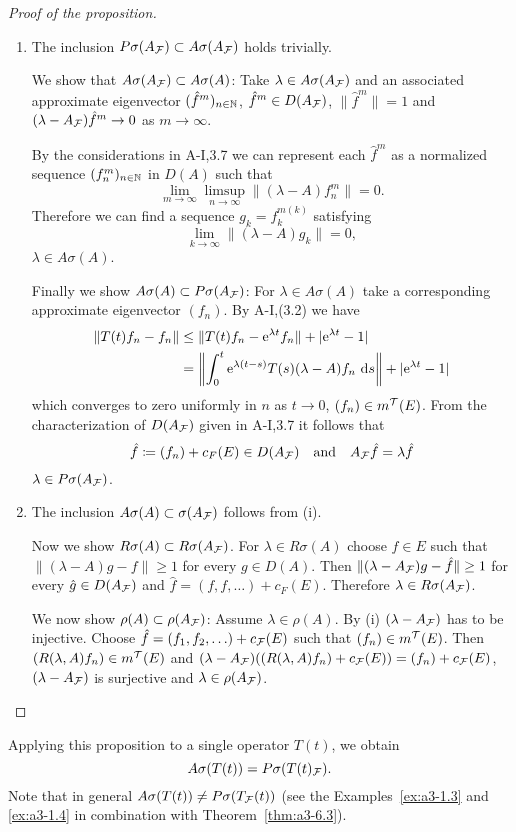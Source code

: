 \begin{proof}[Proof of the proposition]
\begin{enumerate}[\upshape (i), wide, labelindent=.5em]
\item 
The inclusion $P\sigma(A_{\mathcal{F}}) \subset A\sigma(A_{\mathcal{F}})$ holds trivially.

We show that $A\sigma(A_{\mathcal{F}}) \subset A\sigma(A)$: Take $\lambda \in A\sigma(A_{\mathcal{F}})$ and an associated approximate eigenvector $({\hat{f}^{m}})_{n \in \mathbb{N}}$, \ie $\hat{f}^{m} \in D(A_{\mathcal{F}})$, $\|\hat{f}^{m}\| = 1$ and $(\lambda-A_{\mathcal{F}})\hat{f}^{m} \to 0$ as $m \to \infty$.

By the considerations in A-I,3.7 we can represent each $\hat{f}^{m}$ as a normalized sequence $(f_{n}^{m})_{n \in \mathbb{N}}$ in $D(A)$ such that
\[
\lim_{m \to \infty} \limsup_{n \to \infty} \|(\lambda-A)f_{n}^{m}\| = 0 .
\]
Therefore we can find a sequence $g_{k} = f_{k}^{m(k)}$ satisfying
\[
\lim_{k \to \infty} \|(\lambda-A)g_{k}\| = 0 ,
\]
\ie $\lambda \in A\sigma(A)$.

Finally we show $A\sigma(A) \subset P\sigma(A_{\mathcal{F}})$: For $\lambda \in A\sigma(A)$ take a corresponding approximate eigenvector $(f_{n})$.
By A-I,(3.2) we have
\begin{align*}
\|T(t)f_{n} - f_{n}\| &\leq \|T(t)f_{n} - \mathrm{e}^{\lambda t}f_{n}\| + |\mathrm{e}^{\lambda t} - 1| \\
&= \left\|\int_{0}^{t} \mathrm{e}^{\lambda(t-s)}T(s)(\lambda-A)f_{n} \, \mathop{}\!\mathrm{d}{s}\right\| + |\mathrm{e}^{\lambda t} -1|
\end{align*}
which converges to zero uniformly in $n$ as $t \to 0$, \ie $(f_{n}) \in m^{\mathcal{T}}(E)$.
From the characterization of $D(A_{\mathcal{F}})$ given in A-I,3.7 it follows that
\[
	\hat{f} \coloneqq (f_{n}) + c_{F}(E) \in D(A_{\mathcal{F}})
	\quad \text{and} \quad
	A_{\mathcal{F}}\hat{f} = \lambda\hat{f}
\]
\ie  $\lambda \in P\sigma(A_{\mathcal{F}}) $.

\item 
The inclusion $A\sigma(A) \subset \sigma(A_{\mathcal{F}})$ follows from (i). 

Now we show $R\sigma(A) \subset R\sigma(A_{\mathcal{F}})$.
For $\lambda \in R\sigma(A)$ choose $f \in E$ such that $\|(\lambda-A)g - f\| \geq 1$ for every $g \in D(A)$.
Then $\|(\lambda-A_{\mathcal{F}})g - \hat{f}\| \geq 1$ for every $\hat{g} \in D(A_{\mathcal{F}})$ and $\hat{f} = (f,f,\ldots) + c_{F}(E)$.
Therefore $\lambda \in R\sigma(A_{\mathcal{F}})$.

We now show $\rho(A) \subset \rho(A_{\mathcal{F}})$: Assume $\lambda \in \rho(A)$.
By (i) $(\lambda-A_{\mathcal{F}})$ has to be injective.
Choose $\hat{f} = (f_{1},f_{2},\ldots) + c_{\mathcal{F}}(E)$ such that $(f_{n}) \in m^{\mathcal{T}}(E)$.
Then $(R(\lambda,A)f_{n}) \in m^{\mathcal{T}}(E)$ and $(\lambda-A_{\mathcal{F}})((R(\lambda,A)f_{n})+c_{\mathcal{F}}(E)) = (f_{n}) + c_{\mathcal{F}}(E)$, \ie $(\lambda-A_{\mathcal{F}})$ is surjective and $\lambda \in \rho(A_{\mathcal{F}})$.
\end{enumerate}
\end{proof}
Applying this proposition to a single operator $T(t)$, we obtain
\[
A\sigma(T(t)) = P\sigma(T(t)_{\mathcal{F}}) .
\]
Note that in general $A\sigma(T(t)) \neq P\sigma(T_{\mathcal{F}}(t))$ (see the Examples~\ref{ex:a3-1.3} and \ref{ex:a3-1.4} in combination with Theorem~\ref{thm:a3-6.3}).

